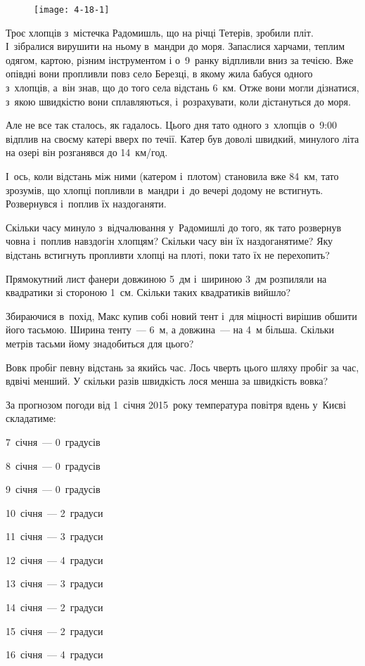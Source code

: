 \problem
{}

\begin{wrapfigure}{R}{0.4\textwidth}
  \vspace{-15pt}
  \begin{center}
    \texttt{[image: 4-18-1]}
  \end{center}
  \vspace{-15pt}
\end{wrapfigure}

Троє хлопців з~містечка Радомишль, що на річці Тетерів, зробили пліт.
І~зібралися вирушити на ньому в~мандри до моря. Запаслися харчами,
теплим одягом, картою, різним інструментом і о~9~ранку відпливли вниз
за течією. Вже опівдні вони пропливли повз село Березці, в якому жила
бабуся одного з~хлопців, а~він знав, що до того села відстань 6~км.
Отже вони могли дізнатися, з~якою швидкістю вони сплавляються,
і~розрахувати, коли дістануться до моря.

Але не все так сталось, як гадалось. Цього дня тато одного з~хлопців
о~9:00 відплив на своєму катері вверх по течії. Катер був доволі швидкий,
минулого літа на озері він розганявся до 14~км/год.

І~ось, коли відстань між ними (катером і~плотом) становила вже 84~км,
тато зрозумів, що хлопці попливли в~мандри і~до вечері додому не встигнуть.
Розвернувся і~поплив їх наздоганяти.

Скільки часу минуло з~відчалювання у~Радомишлі до того, як тато
розвернув човна і~поплив навздогін хлопцям?
Скільки часу він їх наздоганятиме?
Яку відстань встигнуть пропливти хлопці на плоті, поки тато їх не перехопить?


\problem
Прямокутний лист фанери довжиною 5~дм і~шириною 3~дм розпиляли на квадратики
зі стороною 1~см.
Скільки таких квадратиків вийшло?


\problem
Збираючися в~похід, Макс купив собі новий тент і~для міцності вирішив
обшити його тасьмою. Ширина тенту~--- 6~м, а довжина~--- на 4~м більша.
Скільки метрів тасьми йому знадобиться для цього?


\problem
Вовк пробіг певну відстань за якийсь час.
Лось чверть цього шляху пробіг за час, вдвічі менший.
У скільки разів швидкість лося менша за швидкість вовка?


\problem
За прогнозом погоди від 1~січня 2015~року температура повітря вдень
у~Києві складатиме:

\begin{multicols}{2}
  7~січня~--- 0~градусів

  8~січня~--- 0~градусів

  9~січня~--- 0~градусів

  10~січня~--- 2~градуси

  11~січня~--- 3~градуси

  12~січня~--- 4~градуси

  13~січня~--- 3~градуси

  14~січня~--- 2~градуси

  15~січня~--- 2~градуси

  16~січня~--- 4~градуси
\end{multicols}

